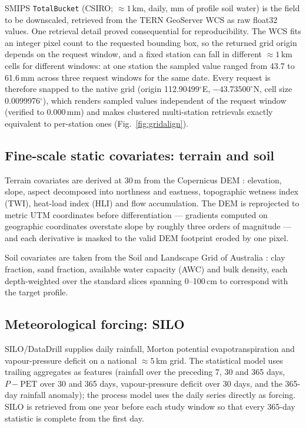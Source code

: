 \documentclass[11pt,a4paper]{article}
\begin{document}
SMIPS \texttt{TotalBucket} (CSIRO; ${\approx}1$\,km, daily, mm of profile soil
water) is the field to be downscaled, retrieved from the TERN GeoServer WCS as
raw float32 values. One retrieval detail proved consequential for
reproducibility. The WCS fits an integer pixel count to the requested bounding
box, so the returned grid origin depends on the request window, and a fixed
station can fall in different ${\approx}1$\,km cells for different windows: at
one station the sampled value ranged from 43.7 to 61.6\,mm across three
request windows for the same date. Every request is therefore snapped to the
native grid (origin 112.90499$^\circ$E, $-43.73500^\circ$N, cell size
0.0099976$^\circ$), which renders sampled values independent of the request
window (verified to 0.000\,mm) and makes clustered multi-station retrievals
exactly equivalent to per-station ones (Fig.~\ref{fig:gridalign}).

\subsection{Fine-scale static covariates: terrain and soil}\label{sec:statics}

Terrain covariates are derived at 30\,m from the Copernicus DEM
\citep{copernicusdem}: elevation, slope, aspect decomposed into northness and
eastness, topographic wetness index (TWI), heat-load index (HLI) and flow
accumulation. The DEM is reprojected to metric UTM coordinates before
differentiation --- gradients computed on geographic coordinates overstate
slope by roughly three orders of magnitude --- and each derivative is masked
to the valid DEM footprint eroded by one pixel.

Soil covariates are taken from the Soil and Landscape Grid of Australia
\citep[SLGA v2, ${\sim}90$\,m;][]{grundy2015slga}: clay fraction, sand
fraction, available water capacity (AWC) and bulk density, each depth-weighted
over the standard slices spanning 0--100\,cm to correspond with the target
profile.

\subsection{Meteorological forcing: SILO}\label{sec:silo}

SILO/DataDrill \citep{jeffrey2001silo} supplies daily rainfall, Morton
potential evapotranspiration \citep{morton1983} and vapour-pressure deficit on
a national ${\approx}5$\,km grid. The statistical model uses trailing
aggregates as features (rainfall over the preceding 7, 30 and 365 days,
$P-\mathrm{PET}$ over 30 and 365 days, vapour-pressure deficit over 30 days,
and the 365-day rainfall anomaly); the process model uses the daily series
directly as forcing. SILO is retrieved from one year before each study window
so that every 365-day statistic is complete from the first day.
\end{document}
